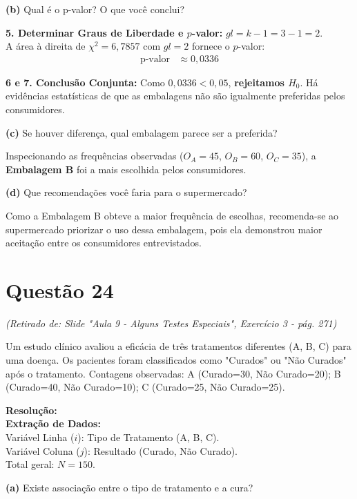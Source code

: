 \documentclass[12pt, a4paper]{article}
\begin{document}
\medskip\noindent\textbf{(b)} Qual é o p-valor? O que você conclui?

\noindent \textbf{5. Determinar Graus de Liberdade e $p$-valor:}
$gl = k - 1 = 3 - 1 = \boxed{2}$. \\
A área à direita de $\chi^2 = 6{,}7857$ com $gl = 2$ fornece o $p$-valor:
\begin{align*}
\text{p-valor} &\approx \boxed{0{,}0336}
\end{align*}

\noindent \textbf{6 e 7. Conclusão Conjunta:} Como $0{,}0336 < 0{,}05$,
\textbf{rejeitamos $H_0$}. Há evidências estatísticas de que as embalagens
não são igualmente preferidas pelos consumidores.

\medskip\noindent\textbf{(c)} Se houver diferença, qual embalagem parece ser a preferida?

\noindent Inspecionando as frequências observadas ($O_A = 45$, $O_B = 60$, $O_C = 35$), a \textbf{Embalagem B} foi a mais escolhida pelos consumidores.

\medskip\noindent\textbf{(d)} Que recomendações você faria para o supermercado?

\noindent Como a Embalagem B obteve a maior frequência de escolhas,
recomenda-se ao supermercado priorizar o uso dessa embalagem, pois ela
demonstrou maior aceitação entre os consumidores entrevistados.


\section*{Questão 24}
\textit{(Retirado de: Slide "Aula 9 - Alguns Testes Especiais", Exercício 3 - pág. 271)}

Um estudo clínico avaliou a eficácia de três tratamentos diferentes (A, B, C) para uma doença. Os pacientes foram classificados como "Curados" ou "Não Curados" após o tratamento. Contagens observadas: A (Curado=30, Não Curado=20); B (Curado=40, Não Curado=10); C (Curado=25, Não Curado=25).

\vspace{0.3cm}
\noindent\textbf{Resolução:}\\
\textbf{Extração de Dados:} \\
Variável Linha ($i$): Tipo de Tratamento (A, B, C). \\
Variável Coluna ($j$): Resultado (Curado, Não Curado). \\
Total geral: $N = 150$.

\medskip\noindent\textbf{(a)} Existe associação entre o tipo de tratamento e a cura?
\end{document}
